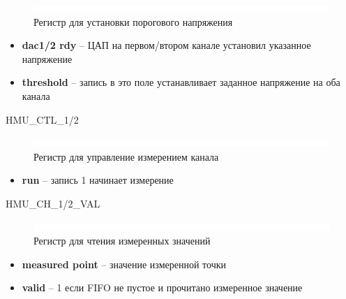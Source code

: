 \begin{figure}[ht!] 
	\center
	\includegraphics  {my_folder/images//blank}
	\caption{Регистр для установки порогового напряжения} 
	\label{fig:thr-reg}  
\end{figure}
\FloatBarrier
\noindent
\begin{itemize}[label={}]
	\item \textbf{dac1/2 rdy} -- ЦАП на первом/втором канале установил указанное напряжение
	\item \textbf{threshold} -- запись в это поле устанавливает заданное напряжение на оба канала\\
\end{itemize}
\newpage
\FloatBarrier

\begin{register}{H}{MU\_CTL\_1/2}{}%
\label{example}%
%
%
 \regnewline%
\end{register}

\begin{figure}[ht!] 
	\center
	\includegraphics  {my_folder/images//blank}
	\caption{Регистр для управление измерением канала} 
	\label{fig:mu-ctl-reg}  
\end{figure}
\FloatBarrier
\begin{itemize}[label={}]
	\item \textbf{run} -- запись 1 начинает измерение\\
\end{itemize}


\begin{register}{H}{MU\_CH\_1/2\_VAL}{}%
\label{example}%
%
%
%
 \regnewline%
\end{register}

\begin{figure}[ht!] 
	\center
	\includegraphics  {my_folder/images//blank}
	\caption{Регистр для чтения измеренных значений} 
	\label{fig:mu-p-reg}  
\end{figure}
\FloatBarrier
\begin{itemize}[label={}]
	\item \textbf{measured point} -- значение измеренной точки
	\item \textbf{valid} -- 1 если FIFO не пустое и прочитано измеренное значение\\
\end{itemize}

\FloatBarrier




\newpage